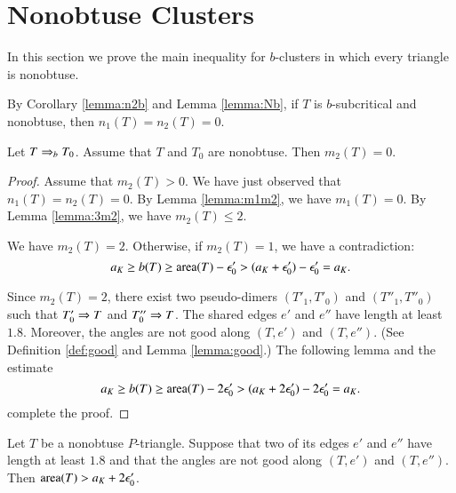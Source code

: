 \section{Nonobtuse Clusters}

In this section we prove the main inequality for $b$-clusters in which every
triangle is nonobtuse.

By Corollary \ref{lemma:n2b} and Lemma \ref{lemma:Nb}, 
if $T$ is $b$-subcritical and nonobtuse, then $n_1(T)=n_2(T)=0$.


\begin{lemma}\label{lemma:m2} Let $T\Rightarrow_{b} T_0$. Assume that $T$ and $T_0$ are nonobtuse.
Then $m_2(T)=0$.
\end{lemma}

\begin{proof}  Assume that $m_2(T)>0$.  We have just observed that $n_1(T)=n_2(T)=0$.
By Lemma \ref{lemma:m1m2}, we have $m_1(T)=0$.
By Lemma \ref{lemma:3m2}, we have $m_2(T)\le 2$. 


We have $m_2(T)=2$.  Otherwise, if $m_2(T)=1$, we have a contradiction:
\[
a_K \ge b(T) \ge {\operatorname{area}}(T) - \epsilon_0' > (a_K + \epsilon_0') - \epsilon_0' = a_K.
\]

Since $m_2(T)=2$, there exist two pseudo-dimers $(T'_1,T'_0)$ and $(T''_1,T''_0)$ such that
$T'_0\Rightarrow T$ and $T''_0\Rightarrow T$.  The shared edges $e'$ and $e''$ have length at least $1.8$.
Moreover, the angles are not good along $(T,e')$ and $(T,e'')$.  (See Definition \ref{def:good} and Lemma \ref{lemma:good}.)
The following lemma and the estimate 
\[
a_K \ge b(T) \ge {\operatorname{area}}(T) - 2\epsilon_0' > (a_K + 2\epsilon_0') - 2\epsilon_0' = a_K.
\]
complete the proof.
\end{proof}

\begin{lemma} Let $T$ be a nonobtuse $P$-triangle.  Suppose that two of its edges $e'$ and $e''$ have length at least $1.8$
and that the angles are not good along $(T,e')$ and $(T,e'')$.  Then ${\operatorname{area}}(T) > a_K + 2\epsilon_0'$.
\end{lemma}

